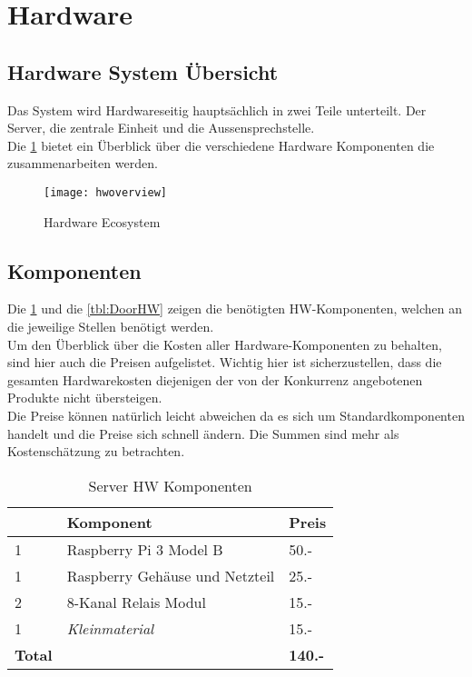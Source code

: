 \section{Hardware}
\label{sec:chapterexample}

\subsection{Hardware System Übersicht}
Das System wird Hardwareseitig hauptsächlich in zwei Teile unterteilt. Der Server, die zentrale Einheit und die Aussensprechstelle.
\\
Die \cref{fig:hwoverview} bietet ein Überblick über die verschiedene Hardware Komponenten die zusammenarbeiten werden.
\begin{figure}[htb!]
	\begin{center}
		\texttt{[image: hwoverview]}
		\caption[Hardware Ecosystem]{Hardware Ecosystem}
		\label{fig:hwoverview}
	\end{center}
\end{figure}
\subsection{Komponenten}
Die \cref{tbl:SrvHW} und die \cref{tbl:DoorHW} zeigen die benötigten HW-Komponenten, welchen an die jeweilige Stellen benötigt werden.
\\
Um den Überblick über die Kosten aller Hardware-Komponenten zu behalten, sind hier auch die Preisen aufgelistet. Wichtig hier ist sicherzustellen, dass die gesamten Hardwarekosten diejenigen der von der Konkurrenz angebotenen Produkte nicht übersteigen.
\\
Die Preise können natürlich leicht abweichen da es sich um Standardkomponenten handelt und die Preise sich schnell ändern. Die Summen sind mehr als Kostenschätzung zu betrachten.

\begin{table}[]
	\centering
	\label{my-label}
	\begin{tabular}{l|ll}
		\multicolumn{1}{r|}{} \textbf{Anzahl} & \textbf{Komponent} \hspace{180pt} & \textbf{Preis} 	\\ \hline
		1	&	Raspberry Pi 3 Model B						& 50.-				\\ \hline
		1	&	Raspberry Gehäuse und Netzteil				& 25.-			\\ \hline
		2	&	8-Kanal Relais Modul						& 15.-			\\ \hline
		1	&	\textit{Kleinmaterial}						& 15.-			\\ \hline
		\textbf{Total}	&									& \textbf{140.-}			\\ \hline
	\end{tabular}
	\caption{Server HW Komponenten}
	\label{tbl:SrvHW}
\end{table}

